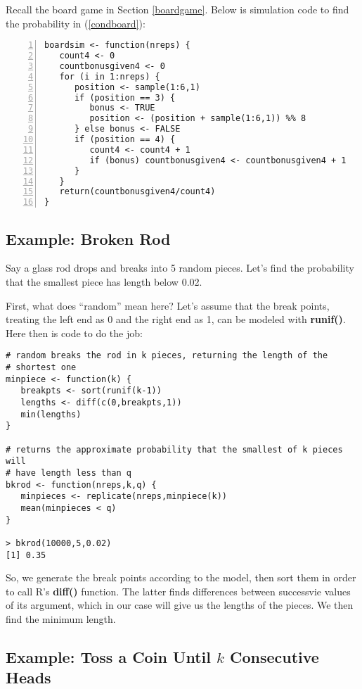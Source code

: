 Recall the board game in Section \ref{boardgame}.  Below is simulation
code to find the probability in (\ref{condboard}):

\begin{Verbatim}[fontsize=\relsize{-2},numbers=left]
boardsim <- function(nreps) {
   count4 <- 0
   countbonusgiven4 <- 0
   for (i in 1:nreps) {
      position <- sample(1:6,1)
      if (position == 3) {
         bonus <- TRUE
         position <- (position + sample(1:6,1)) %% 8
      } else bonus <- FALSE
      if (position == 4) {
         count4 <- count4 + 1
         if (bonus) countbonusgiven4 <- countbonusgiven4 + 1
      }
   }
   return(countbonusgiven4/count4)
}
\end{Verbatim}

\subsection{Example:  Broken Rod}
\label{brokenrod}

Say a glass rod drops and breaks into 5 random pieces.  Let's find the
probability that the smallest piece has length below 0.02.  

First, what does ``random'' mean here?  Let's assume that the break
points, treating the left end as 0 and the right end as 1, can be
modeled with {\bf runif()}.  Here then is code to do the job:

\begin{lstlisting}
# random breaks the rod in k pieces, returning the length of the
# shortest one
minpiece <- function(k) {
   breakpts <- sort(runif(k-1))
   lengths <- diff(c(0,breakpts,1))
   min(lengths)
}

# returns the approximate probability that the smallest of k pieces will
# have length less than q
bkrod <- function(nreps,k,q) {
   minpieces <- replicate(nreps,minpiece(k))
   mean(minpieces < q) 
}

> bkrod(10000,5,0.02) 
[1] 0.35
\end{lstlisting}

So, we generate the break points according to the model, then sort them
in order to call R's {\bf diff()} function.  The latter finds
differences between successvie values of its argument, which in our case
will give us the lengths of the pieces.  We then find the minimum
length.

\subsection{Example: Toss a Coin Until $k$ Consecutive Heads}

